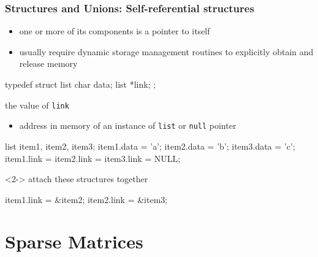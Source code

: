 \documentclass[newPxFont,sthlmFooter,nooffset]{beamer}
\begin{document}
\begin{frame}
  \frametitle{Structures and Unions: {\large Self-referential structures}}
  \begin{itemize}
  \item one or more of its components is a pointer to itself
  \item usually require dynamic storage management routines to
    explicitly obtain and release memory
  \end{itemize}
\begin{codedef}
typedef struct list {
    char data;
    list *link;
};    
\end{codedef}
the value of \texttt{link}
\begin{itemize}
\item address in memory of an instance of \texttt{list} or \texttt{null} pointer
\end{itemize}

\framebreak



\begin{codedef}
list item1, item2, item3;
item1.data = 'a';
item2.data = 'b';
item3.data = 'c';
item1.link = item2.link = item3.link = NULL;   
\end{codedef}
\begin{uncoverenv}<2->
attach these structures together
\begin{codedef}
item1.link = &item2;
item2.link = &item3;
\end{codedef}
\end{uncoverenv}
\end{frame}




\section{Sparse Matrices}
\end{document}
